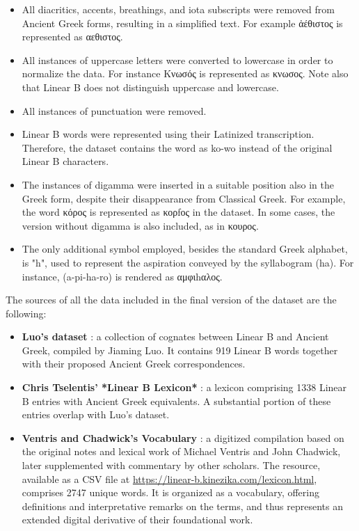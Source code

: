\begin{itemize}
    \item All diacritics, accents, breathings, and iota subscripts were removed from Ancient Greek forms, resulting in a simplified text. For example \textgreek{ἀέθιστος} is represented as \textgreek{αεθιστος}.

    \item All instances of uppercase letters were converted to lowercase in order to normalize the data. For instance \textgreek{Κνωσός} is represented as \textgreek{κνωσος}.
    Note also that Linear B does not distinguish uppercase and lowercase.
    
    \item All instances of punctuation were removed.
    
    \item Linear B words were represented using their Latinized transcription.
    Therefore, the dataset contains the word \textlinb{\Bko\Bwo} as ko-wo instead of the original Linear B characters.

    \item The instances of digamma were inserted in a suitable position also in the Greek form, despite their disappearance from Classical Greek.
    For example, the word \textgreek{κόρος} is represented as \textgreek{κορfος} in the dataset.
    In some cases, the version without digamma is also included, as in \textgreek{κουρος}.

    \item The only additional symbol employed, besides the standard Greek alphabet, is "h", used to represent the aspiration conveyed by the syllabogram \textlinb{\Baii} (ha).
    For instance, \textlinb{\Ba\Bpi\Baii\Bro} (a-pi-ha-ro) is rendered as \textgreek{αμφιhαλος}.
\end{itemize}

The sources of all the data included in the final version of the dataset are the following:

\begin{itemize}
\item \textbf{Luo's dataset} \cite{luo}: a collection of cognates between Linear B and Ancient Greek, compiled by Jiaming Luo. It contains 919 Linear B words together with their proposed Ancient Greek correspondences.
\item \textbf{Chris Tselentis' *Linear B Lexicon*} \cite{tselentis}: a lexicon comprising 1338 Linear B entries with Ancient Greek equivalents. A substantial portion of these entries overlap with Luo's dataset.
\item \textbf{Ventris and Chadwick's Vocabulary} \cite{chadwick-notes}: a digitized compilation based on the original notes and lexical work of Michael Ventris and John Chadwick, later supplemented with commentary by other scholars. The resource, available as a CSV file at \url{https://linear-b.kinezika.com/lexicon.html}, comprises 2747 unique words.
It is organized as a vocabulary, offering definitions and interpretative remarks on the terms, and thus represents an extended digital derivative of their foundational work.
\end{itemize}

